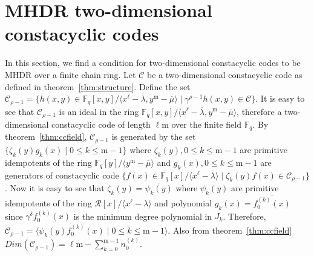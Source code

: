 \documentclass[12pt,a4paper]{article}
\begin{document}
\section{MHDR two-dimensional constacyclic codes}
In this section, we find a condition for two-dimensional constacyclic codes to be MHDR over a finite chain ring.
Let $\mathscr{C}$ be a two-dimensional constacyclic code as defined in theorem~\ref{thm:structure}. Define the set $\mathscr{C}_{\rho-1}= \{h(x,y) \in \mathbb{F}_q[x,y] / \langle x^{\ell}-\overline{\lambda}, y^{\mathrm{m}}-\overline{\mu} \rangle \mid \gamma^{\rho-1}h(x,y) \in \mathscr{C} \}$. It is easy to see that $\mathscr{C}_{\rho-1}$ is an ideal in the ring $\mathbb{F}_q[x,y] / \langle x^{\ell}-\overline{\lambda}, y^{\mathrm{m}}-\overline{\mu} \rangle$, therefore a two-dimensional constacyclic code of length $\ell\mathrm{m}$ over the finite field $\mathbb{F}_q$. By theorem~\ref{thm:ccfield}, $\mathscr{C}_{\rho-1}$ is generated by the set $\{ \zeta_k(y)g_k(x) \mid 0 \le k \le \mathrm{m}-1 \}$ where $\zeta_k(y), 0 \le k \le \mathrm{m}-1$ are primitive idempotents of the ring $\mathbb{F}_q[y] / \langle y^{\mathrm{m}}-\overline{\mu} \rangle$ and $g_k(x), 0 \le k \le \mathrm{m}-1$ are generators of constacyclic code $\{ f(x) \in \mathbb{F}_q[x] / \langle x^{\ell}-\overline{\lambda} \rangle \mid \zeta_k(y)f(x) \in \mathscr{C}_{\rho-1} \}$. Now it is easy to see that $\zeta_k(y)= \overline{\psi_k(y)}$ where $\psi_k(y)$ are primitive idempotents of the ring $\mathcal{R}[x]/ \langle x^{\ell}- \lambda \rangle$ and polynomial $g_k(x)=\overline{f_0^{(k)}(x)}$ since $\gamma^{\delta}f_0^{(k)}(x)$ is the minimum degree polynomial in $J_k$. Therefore, $\mathscr{C}_{\rho-1}= \langle \overline{\psi_k(y)f_0^{(k)}(x)} \mid 0 \le k \le \mathrm{m}-1 \rangle$. Also from theorem~\ref{thm:ccfield} $Dim(\mathscr{C}_{\rho-1})=\ell\mathrm{m}- \sum_{k=0}^{\mathrm{m}-1}n_0^{(k)}$.
\end{document}
